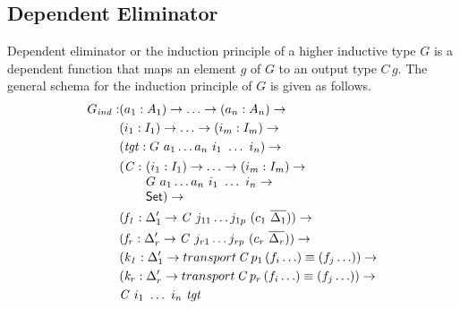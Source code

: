 \documentclass[sigplan,10pt]{acmart}
\begin{document}
\subsection{Dependent Eliminator}
\label{sec:sec4.3}

Dependent eliminator or the induction principle of a higher inductive type $G$ is a dependent function that maps an element $g$ of $G$ to an output type $C \, g$. The general schema for the induction principle of $G$ is given as follows.
\begin{align*}
G_{\mathit{ind}} : & (a_1 : A_1) \to \ldots \to (a_n : A_n) \to\\
& (i_1 : I_1) \to \ldots \to (i_m : I_m) \to\\
& (\mathit{tgt} : G\ a_1 \ldots a_n\ i_1\ \ldots\ i_n) \to\\
& \begin{array}{@{}l@{}l}(\mathit{C} :\ & (i_1 : I_1) \to \ldots \to (i_m : I_m) \to\\  & G\ a_1 \ldots a_n\ i_1\ \ldots\ i_n \to\\ &\SET{})\to\end{array} \\
& (\mathit{f_1} : \Delta_1^\prime \to \mathit{C}\ j_{11} \ldots j_{1p}\ (c_1\ \overline{\Delta_1})) \to \\
& (\mathit{f_r} : \Delta_r^\prime \to \mathit{C}\ j_{r1} \ldots j_{rp}\ (c_r\ \overline{\Delta_r})) \to \\
& (\mathit{k_1} : \Delta_1^\prime \to transport \, \mathit{C} \, p_1 \, (f_i \ldots) \equiv (f_j \ldots)) \to \\
& (\mathit{k_r} : \Delta_r^\prime \to transport \, \mathit{C} \, p_r \, (f_i \ldots) \equiv (f_j \ldots)) \to \\
& \mathit{C}\ i_1\ \ldots\ i_n\ \mathit{tgt}
\end{align*}
\end{document}
